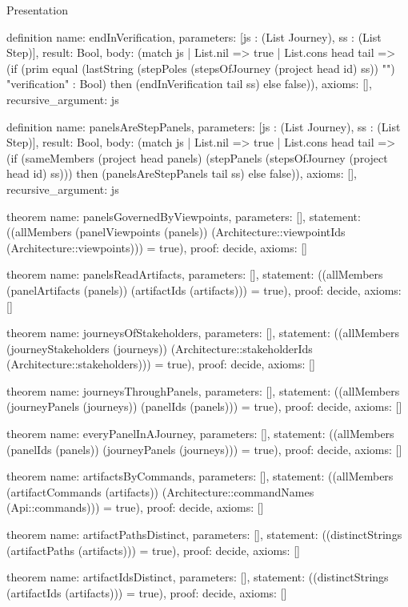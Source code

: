 \begin{lexlean}{Presentation}
\begin{semanticmodule}
definition{
  name: endInVerification,
  parameters: [js : (List Journey), ss : (List Step)],
  result: Bool,
  body: (match js
    | List.nil => true
    | List.cons head tail => (if (prim equal (lastString (stepPoles (stepsOfJourney (project head id) ss)) "") "verification" : Bool) then (endInVerification tail ss) else false)),
  axioms: [],
  recursive_argument: js
}

definition{
  name: panelsAreStepPanels,
  parameters: [js : (List Journey), ss : (List Step)],
  result: Bool,
  body: (match js
    | List.nil => true
    | List.cons head tail => (if (sameMembers (project head panels) (stepPanels (stepsOfJourney (project head id) ss))) then (panelsAreStepPanels tail ss) else false)),
  axioms: [],
  recursive_argument: js
}

theorem{
  name: panelsGovernedByViewpoints,
  parameters: [],
  statement: ((allMembers (panelViewpoints (panels)) (Architecture::viewpointIds (Architecture::viewpoints))) = true),
  proof: decide{},
  axioms: []
}

theorem{
  name: panelsReadArtifacts,
  parameters: [],
  statement: ((allMembers (panelArtifacts (panels)) (artifactIds (artifacts))) = true),
  proof: decide{},
  axioms: []
}

theorem{
  name: journeysOfStakeholders,
  parameters: [],
  statement: ((allMembers (journeyStakeholders (journeys)) (Architecture::stakeholderIds (Architecture::stakeholders))) = true),
  proof: decide{},
  axioms: []
}

theorem{
  name: journeysThroughPanels,
  parameters: [],
  statement: ((allMembers (journeyPanels (journeys)) (panelIds (panels))) = true),
  proof: decide{},
  axioms: []
}

theorem{
  name: everyPanelInAJourney,
  parameters: [],
  statement: ((allMembers (panelIds (panels)) (journeyPanels (journeys))) = true),
  proof: decide{},
  axioms: []
}

theorem{
  name: artifactsByCommands,
  parameters: [],
  statement: ((allMembers (artifactCommands (artifacts)) (Architecture::commandNames (Api::commands))) = true),
  proof: decide{},
  axioms: []
}

theorem{
  name: artifactPathsDistinct,
  parameters: [],
  statement: ((distinctStrings (artifactPaths (artifacts))) = true),
  proof: decide{},
  axioms: []
}

theorem{
  name: artifactIdsDistinct,
  parameters: [],
  statement: ((distinctStrings (artifactIds (artifacts))) = true),
  proof: decide{},
  axioms: []
}


\end{semanticmodule}
\end{lexlean}
